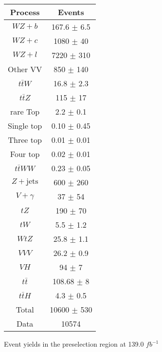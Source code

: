\begin{center}
\begin{tabular}{|c|c|}
\hline
Process & Events \\
\hline 
  $WZ + b$   & 167.6 $\pm$ 6.5 \\
  $WZ + c$   & 1080 $\pm$ 40 \\
  $WZ + l$   & 7220 $\pm$ 310 \\
  Other VV   & 850 $\pm$ 140 \\
  $t\bar{t}W$   & 16.8 $\pm$ 2.3 \\
  $t\bar{t}Z$   & 115 $\pm$ 17 \\
  rare Top   & 2.2 $\pm$ 0.1 \\
  Single top   & 0.10 $\pm$ 0.45 \\
  Three top   & 0.01 $\pm$ 0.01 \\
  Four top   & 0.02 $\pm$ 0.01 \\
  $t\bar{t}WW$   & 0.23 $\pm$ 0.05 \\
  $Z+\text{jets}$   & 600 $\pm$ 260 \\
  $V+\gamma$   & 37 $\pm$ 54 \\
  $tZ$   & 190 $\pm$ 70 \\
  $tW$   & 5.5 $\pm$ 1.2 \\
  $WtZ$   & 25.8 $\pm$ 1.1 \\
  $VVV$   & 26.2 $\pm$ 0.9 \\
  $VH$   & 94 $\pm$ 7 \\
  $t\bar{t}$   & 108.68 $\pm$ 8 \\
  $t\bar{t}H$   & 4.3 $\pm$ 0.5 \\
\hline
  Total  & 10600 $\pm$ 530 \\
\hline
  Data   & 10574 \\
\hline 
\end{tabular} 
\caption{Event yields in the preselection region at 139.0 $fb^{-1}$} 
\end{center} 

